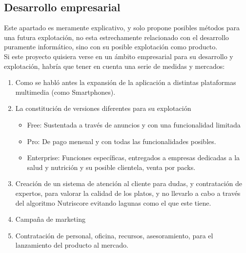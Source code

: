 \subsection{Desarrollo empresarial}
Este apartado es meramente explicativo, y solo propone posibles métodos para una futura explotación, no esta estrechamente relacionado con el desarrollo puramente informático, sino con su posible explotación como producto.
\\

Si este proyecto quisiera verse en un ámbito empresarial para su desarrollo y explotación, habría que tener en cuenta una serie de medidas y mercados:
\begin{enumerate}
\item	Como se habló antes la expansión de la aplicación a distintas plataformas multimedia (como Smartphones).
\item	La constitución de versiones diferentes para su explotación
\begin{itemize}
\item	Free: Sustentada a través de anuncios y con una funcionalidad limitada
\item	Pro: De pago mensual y con todas las funcionalidades posibles.
\item	Enterprise: Funciones específicas, entregados a empresas dedicadas a la salud y nutrición y su posible clientela, venta por packs.
\end{itemize}
\item	Creación de un sistema de atención al cliente para dudas, y contratación de expertos, para valorar la calidad de los platos, y no llevarlo a cabo a través del algoritmo Nutriscore evitando lagunas como el que este tiene.
\item	Campaña de marketing
\item	Contratación de personal, oficina, recursos, asesoramiento, para el lanzamiento del producto al mercado.
\end{enumerate}
